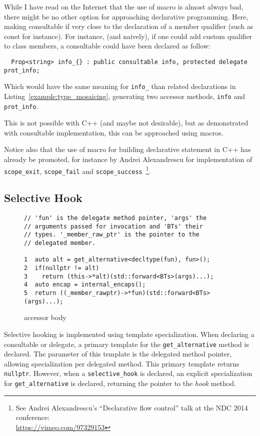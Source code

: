 \documentclass{article}
\begin{document}
While I have read on the Internet that the use of macro is almost always bad, there might be no other option for approaching declarative programming. Here, making consultable if very close to the declaration of a member qualifier (such as const for instance). For instance, (and naively), if one could add custom qualifier to class members, a consultable could have been declared as follow:
\begin{lstlisting}
  Prop<string> info_{} : public consultable info, protected delegate prot_info; 
\end{lstlisting}
 Which would have the same meaning for \texttt{info\_} than related declarations in Listing~\ref{example:type_mosaicing}, generating two accessor methods, \texttt{info} and \texttt{prot\_info}. 

This is not possible with C++ (and maybe not desirable), but as demonstrated with consultable implementation, this can be approached using macros. 

Notice also that the use of macro for building declarative statement in C++ has already be promoted, for instance by Andrei Alexandrescu for implementation of \texttt{scope\_exit}, \texttt{scope\_fail} and \texttt{scope\_success}~\footnote{See Andrei Alexandrescu's ``Declarative flow control'' talk at the NDC 2014 conference:\\ \url{https://vimeo.com/97329153}}.

\subsection{Selective Hook}
\begin{figure}[ht]
{\small
\begin{lstlisting}
// 'fun' is the delegate method pointer, 'args' the 
// arguments passed for invocation and 'BTs' their 
// types. '_member_raw_ptr' is the pointer to the 
// delegated member.

1  auto alt = get_alternative<decltype(fun), fun>();
2  if(nullptr != alt)
3    return (this->*alt)(std::forward<BTs>(args)...);
4  auto encap = internal_encaps();
5  return ((_member_rawptr)->*fun)(std::forward<BTs>(args)...);
\end{lstlisting}}
\cprotect\caption{accessor body}
\label{impl:accessor_method}
\end{figure}

Selective hooking is implemented using template specialization. When declaring a consultable or delegate, a primary template for the \texttt{get\_alternative} method is declared. The parameter of this template is the delegated method pointer, allowing specialization per delegated method. This primary template returns \texttt{nullptr}. However, when a \texttt{selective\_hook} is declared, an explicit specialization for \texttt{get\_alternative} is declared, returning the pointer to the \textit{hook} method. 
\end{document}
